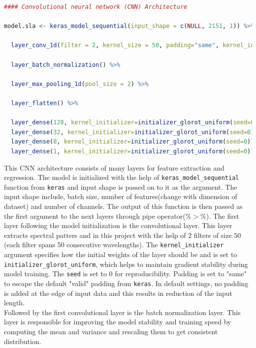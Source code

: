 \documentclass[12pt,a4paper]{report}
\begin{document}
\begin{lstlisting}[language=R, style=mystyle]
#### Convolutional neural network (CNN) Architecture

model.sla <- keras_model_sequential(input_shape = c(NULL, 2151, 1)) %>%

  layer_conv_1d(filter = 2, kernel_size = 50, padding="same", kernel_initializer=initializer_glorot_uniform(seed=0)) %>%
  
  layer_batch_normalization() %>%
  
  layer_max_pooling_1d(pool_size = 2) %>%
  
  layer_flatten() %>%
  
  layer_dense(128, kernel_initializer=initializer_glorot_uniform(seed=0)) %>%
  layer_dense(32, kernel_initializer=initializer_glorot_uniform(seed=0)) %>%
  layer_dense(8, kernel_initializer=initializer_glorot_uniform(seed=0)) %>%
  layer_dense(1, kernel_initializer=initializer_glorot_uniform(seed=0))
\end{lstlisting}

This CNN architecture consists of many layers for feature extraction and regression. The model is initialized with the help of \texttt{keras\_model\_sequential} function from \texttt{keras} and input shape is passed on to it as the argument. The input shape include, batch size, number of features(change with dimension of dataset) and number of channels. The output of this function is then passed as the first argument to the next layers through pipe operator($\%>\%$). The first layer following the model initialization is the convolutional layer. This layer extracts spectral patters and in this project with the help of $2$ filters of size $50$ (each filter spans 50 consecutive wavelengths). The \texttt{kernel\_initializer} argument specifies how the initial weights of the layer should be and is set to \texttt{initializer\_glorot\_uniform}, which helps to maintain gradient stability during model training. The \texttt{seed} is set to $0$ for reproducibility. Padding is set to "same" to escape the default "valid" padding from \texttt{keras}. In default settings, no padding is added at the edge of input data and this results in reduction of the input length.\\

Followed by the first convolutional layer is the batch normalization layer. This layer is responsible for improving the model stability and training speed by computing the mean and variance and rescaling them to get consistent distribution.\\
\end{document}
